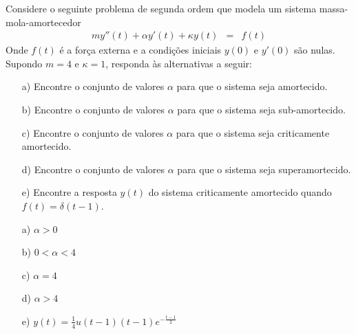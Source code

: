 \begin{Exercise}
 Considere o seguinte problema de segunda ordem que modela um sistema massa-mola-amortecedor
\begin{eqnarray*}
 m y''(t) +\alpha y'(t) + \kappa y(t) &=& f(t)
 \end{eqnarray*}
Onde $f(t)$ é a força externa e a condições iniciais $y(0)$ e $y'(0)$ são nulas.
 Supondo $m=4$ e $\kappa=1$, responda às alternativas a seguir:
 \begin{itemize}
  \item [a)] Encontre o conjunto de valores $\alpha$ para que o sistema seja amortecido.
  \item [b)] Encontre o conjunto de valores $\alpha$ para que o sistema seja sub-amortecido.
  \item [c)] Encontre o conjunto de valores $\alpha$ para que o sistema seja criticamente amortecido.
  \item [d)] Encontre o conjunto de valores $\alpha$ para que o sistema seja superamortecido. 
  \item [e)] Encontre a resposta $y(t)$ do sistema criticamente amortecido quando $f(t)=\delta(t-1)$.
 \end{itemize}

\end{Exercise}
\begin{Answer}
 \begin{itemize}
  \item [a)] $\alpha>0$
  \item [b)] $0<\alpha<4$
  \item [c)] $\alpha=4$
  \item [d)] $\alpha>4$
  \item [e)] $y(t)=\frac{1}{4} u(t-1) (t-1) e^{-\frac{t-1}{2}}$
 \end{itemize}

\end{Answer}



